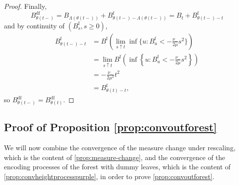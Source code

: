 \begin{proof}
Finally, 
$$B^{\mathrm{df}}_{\theta(t-)}=B_{\Lambda(\theta(t-))}+B^{\mathrm{f}}_{\theta(t-)-\Lambda(\theta(t-))}
=B_{t}+B^{\mathrm{f}}_{\theta(t-)-t}$$
and by continuity of $(B^{\mathrm{f}}_s,s\geq 0)$,
\begin{align*}B^{\mathrm{f}}_{\theta(t-)-t}&=B^{\mathrm{f}}\left({\lim_{s\uparrow t}\inf\{u:B^{\mathrm{f}}_u<-\frac{\nu_-}{2\mu} s^2\}}\right)\\&=\lim_{s\uparrow t} B^{\mathrm{f}}\left({\inf\left\{u:B^{\mathrm{f}}_u<-\frac{\nu_-}{2\mu} s^2\right\}}\right)\\&= -\frac{\nu_-}{2\mu^2}t^2\\
&=B^{\mathrm{f}}_{\theta(t)-t}, \end{align*}
so 
$B^{\mathrm{df}}_{\theta(t-)}=B^{\mathrm{df}}_{\theta(t)}.$
\end{proof}





\subsection{Proof of Proposition \ref{prop:convoutforest}}\label{subsubsec.convaftermeasurechange}
We will now combine the convergence of the measure change under rescaling, which is the content of \cref{prop:measure-change}, and the convergence of the encoding processes of the forest with dummy leaves, which is the content of \cref{prop:convheightprocesspurple}, in order to prove \cref{prop:convoutforest}.

